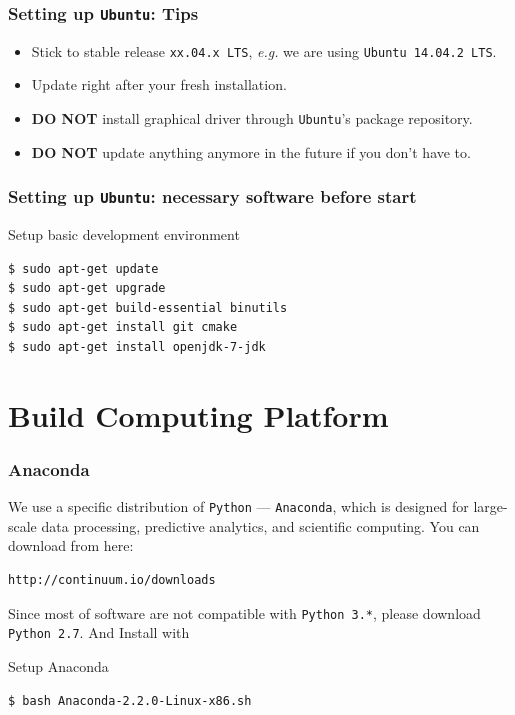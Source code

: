 \documentclass{beamer}
\newcommand{\ubuntu}{\texttt{Ubuntu}\xspace}
\newcommand{\ubuntults}{\texttt{Ubuntu 14.04.2 LTS}\xspace}
\begin{document}
\begin{frame}
\frametitle{Setting up \ubuntu: Tips}

\begin{itemize}
\item[\ding{80}] Stick to stable release \texttt{xx.04.x LTS}, \emph{e.g.} we are using \ubuntults.
\item[\ding{80}] Update right after your fresh installation.
\item[\ding{80}] \textbf{DO NOT} install graphical driver through \ubuntu's package repository.
\item[\ding{80}] \textbf{DO NOT} update anything anymore in the future if you don't have to. 
\end{itemize}

\end{frame}

\begin{frame}[fragile]

\frametitle{Setting up \ubuntu: necessary software before start}

\begin{block}{Setup basic development environment}
\begin{verbatim}
$ sudo apt-get update
$ sudo apt-get upgrade
$ sudo apt-get build-essential binutils
$ sudo apt-get install git cmake
$ sudo apt-get install openjdk-7-jdk
\end{verbatim}
\end{block}

\end{frame}

\section{Build Computing Platform}

\begin{frame}[fragile]
\frametitle{Anaconda}

We use a specific distribution of \texttt{Python} --- \texttt{Anaconda}, which is designed for large-scale data processing, predictive analytics, and scientific computing. You can download from here:
\begin{verbatim}
http://continuum.io/downloads
\end{verbatim}
Since most of software are not compatible with \texttt{Python 3.*}, please download \texttt{Python 2.7}. And Install with
\begin{block}{Setup Anaconda}
\begin{verbatim}
$ bash Anaconda-2.2.0-Linux-x86.sh
\end{verbatim}
\end{block}

\end{frame}
\end{document}
